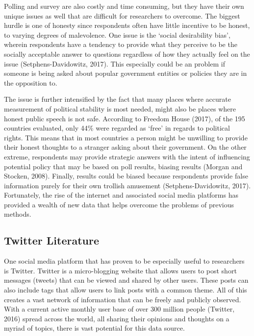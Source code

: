 \documentclass[12pt]{article}
\begin{document}
\begin{spacing}{1.5}
Polling and survey are also costly and time consuming, but they have their own unique issues as well that are difficult for researchers to overcome. The biggest hurdle is one of honesty since respondents often have little incentive to be honest, to varying degrees of malevolence. One issue is the `social desirability bias', wherein respondents have a tendency to provide what they perceive to be the socially acceptable answer to questions regardless of how they actually feel on the issue (Setphens-Davidowitz, 2017). This especially could be an problem if someone is being asked about popular government entities or policies they are in the opposition to. 

The issue is further intensified by the fact that many places where accurate measurement of political stability is most needed, might also be places where honest public speech is not safe. According to Freedom House (2017), of the 195 countries evaluated, only 44\% were regarded as `free' in regards to political rights. This means that in most countries a person might be unwilling to provide their honest thoughts to a stranger asking about their government. On the other extreme, respondents may provide strategic answers with the intent of influencing potential policy that may be based on poll results, biasing results (Morgan and Stocken, 2008). Finally, results could be biased because respondents provide false information purely for their own trollish amusement (Setphens-Davidowitz, 2017). Fortunately, the rise of the internet and associated social media platforms has provided a wealth of new data that helps overcome the problems of previous methods. 

\subsection*{Twitter Literature}

One social media platform that has proven to be especially useful to researchers is Twitter. Twitter is a micro-blogging website that allows users to post short messages (tweets) that can be viewed and shared by other users. These posts can also include tags that allow users to link posts with a common theme. All of this creates a vast network of information that can be freely and publicly observed. With a current active monthly user base of over 300 million people (Twitter, 2016) spread across the world, all sharing their opinions and thoughts on a myriad of topics, there is vast potential for this data source. 


\end{spacing}
\end{document}
